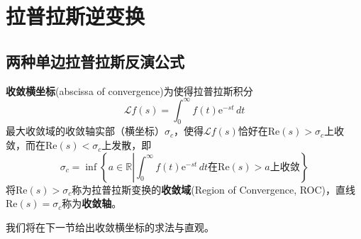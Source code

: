 \section{拉普拉斯逆变换}\label{sec:Laplace_Inverse}

\subsection{两种单边拉普拉斯反演公式}\label{sub:laplace_inversion}

\begin{definition}[收敛横坐标]
    \textbf{收敛横坐标}(abscissa of convergence)为使得拉普拉斯积分
    $$\mathcal{L} f(s)=\int_{0}^{\infty}f(t)\mathrm{e}^{-st}\,dt$$
    最大收敛域的收敛轴实部（横坐标）$\sigma_c$，使得$\mathcal{L} f(s)$恰好在$\mathrm{Re}(s)>\sigma_c$上收敛，而在$\mathrm{Re}(s)<\sigma_c$上发散，即
    \[\sigma_c=\inf\left\{a\in\mathbb{R}\left|\int_0^\infty f(t)\mathrm{e}^{-st}\,dt\text{在}\mathrm{Re}(s)>a\text{上收敛}\right.\right\}\]
    将$\mathrm{Re}(s)>\sigma_c$称为拉普拉斯变换的\textbf{收敛域}(Region of Convergence, ROC)，直线$\mathrm{Re}(s)=\sigma_c$称为\textbf{收敛轴}。
\end{definition}

我们将在下一节给出收敛横坐标的求法与直观。

